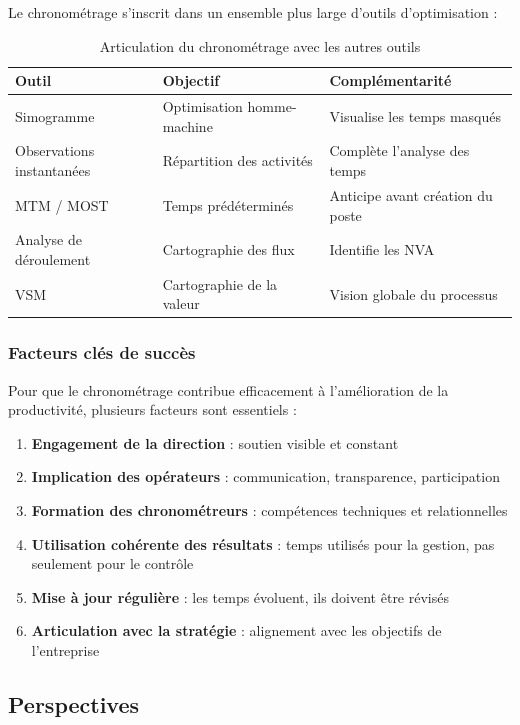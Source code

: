 \documentclass[a4paper,12pt]{article}
\begin{document}
Le chronométrage s'inscrit dans un ensemble plus large d'outils d'optimisation :

\begin{table}[ht]
\centering
\begin{tabular}{|p{4.5cm}|p{4.5cm}|p{5cm}|}
\hline
\textbf{Outil} & \textbf{Objectif} & \textbf{Complémentarité} \\
\hline
Simogramme & Optimisation homme-machine & Visualise les temps masqués \\
Observations instantanées & Répartition des activités & Complète l'analyse des temps \\
MTM / MOST & Temps prédéterminés & Anticipe avant création du poste \\
Analyse de déroulement & Cartographie des flux & Identifie les NVA \\
VSM & Cartographie de la valeur & Vision globale du processus \\
\hline
\end{tabular}
\caption{Articulation du chronométrage avec les autres outils}
\end{table}

\subsubsection*{Facteurs clés de succès}

Pour que le chronométrage contribue efficacement à l'amélioration de la productivité, plusieurs facteurs sont essentiels :

\begin{enumerate}
    \item \textbf{Engagement de la direction} : soutien visible et constant
    \item \textbf{Implication des opérateurs} : communication, transparence, participation
    \item \textbf{Formation des chronométreurs} : compétences techniques et relationnelles
    \item \textbf{Utilisation cohérente des résultats} : temps utilisés pour la gestion, pas seulement pour le contrôle
    \item \textbf{Mise à jour régulière} : les temps évoluent, ils doivent être révisés
    \item \textbf{Articulation avec la stratégie} : alignement avec les objectifs de l'entreprise
\end{enumerate}

\subsection*{Perspectives}
\end{document}
